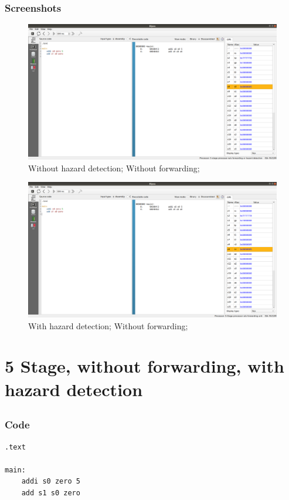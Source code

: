 \documentclass[12pt, fleqn]{article}
\begin{document}
\subsubsection*{Screenshots}
\begin{figure}[H]
  \centering
  \includegraphics[scale=0.25]{Q1/nhnf_end_editor.png}
  \caption{Without hazard detection; Without forwarding;}
\end{figure}
\begin{figure}[H]
  \centering
  \includegraphics[scale=0.25]{Q1/hnf_end_editor.png}
  \caption{With hazard detection; Without forwarding;}
\end{figure}


\newpage
\section{5 Stage, without forwarding, with hazard detection}

\subsection{}
\subsubsection*{Code}
\begin{verbatim}
.text

main:
    addi s0 zero 5
    add s1 s0 zero
\end{verbatim}
\end{document}
